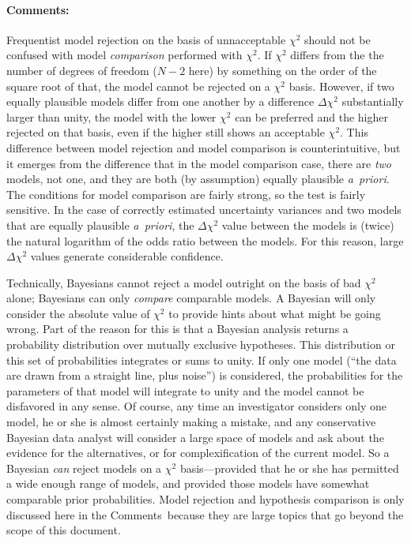 \documentclass[12pt,twoside]{article}
\newcommand{\notenglish}[1]{\textsl{#1}}
\newcommand{\apriori}{\notenglish{a~priori}}
\newcommand{\documentname}{document}
\newcommand{\commentsname}{Comments}
\newenvironment{comments}{\paragraph{\commentsname:}}{}
\begin{document}
\begin{comments}
Frequentist model rejection on the basis of unnacceptable $\chi^2$
should not be confused with model \emph{comparison} performed with
$\chi^2$.  If $\chi^2$ differs from the the number of degrees of
freedom ($N-2$ here) by something on the order of the square root of
that, the model cannot be rejected on a $\chi^2$ basis.  However, if
two equally plausible models differ from one another by a difference
$\Delta\chi^2$ substantially larger than unity, the model with the
lower $\chi^2$ can be preferred and the higher rejected on that basis,
even if the higher still shows an acceptable $\chi^2$.  This
difference between model rejection and model comparison is
counterintuitive, but it emerges from the difference that in the model
comparison case, there are \emph{two} models, not one, and they are
both (by assumption) equally plausible \apriori.  The conditions for
model comparison are fairly strong, so the test is fairly sensitive.
In the case of correctly estimated uncertainty variances and two
models that are equally plausible \apriori, the $\Delta\chi^2$ value
between the models is (twice) the natural logarithm of the odds ratio
between the models.  For this reason, large $\Delta\chi^2$ values
generate considerable confidence.

Technically, Bayesians cannot reject a model outright on the basis of
bad $\chi^2$ alone; Bayesians can only \emph{compare} comparable
models.  A Bayesian will only consider the absolute value of $\chi^2$
to provide hints about what might be going wrong.  Part of the reason
for this is that a Bayesian analysis returns a probability
distribution over mutually exclusive hypotheses.  This distribution or
this set of probabilities integrates or sums to unity.  If only one
model (``the data are drawn from a straight line, plus noise'') is
considered, the probabilities for the parameters of that model will
integrate to unity and the model cannot be disfavored in any sense.
Of course, any time an investigator considers only one model, he or
she is almost certainly making a mistake, and any conservative
Bayesian data analyst will consider a large space of models and ask
about the evidence for the alternatives, or for complexification of
the current model.  So a Bayesian \emph{can} reject models on a
$\chi^2$ basis---provided that he or she has permitted a wide enough
range of models, and provided those models have somewhat comparable
prior probabilities.  Model rejection and hypothesis comparison is
only discussed here in the \commentsname\ because they are large
topics that go beyond the scope of this \documentname.


\end{comments}
\end{document}

